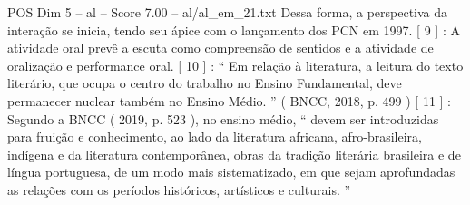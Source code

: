 \begin{textsample}{POS Dim 5 – al – Score 7.00 – al/al\_em\_21.txt}
Dessa forma, a perspectiva da interação se inicia, tendo seu ápice com o lançamento dos PCN em 1997. [ 9 ] : A atividade oral prevê a escuta como compreensão de sentidos e a atividade de oralização e performance oral. [ 10 ] : “ Em relação à literatura, a leitura do texto literário, que ocupa o centro do trabalho no Ensino Fundamental, deve permanecer nuclear também no Ensino Médio. ” ( BNCC, 2018, p. 499 ) [ 11 ] : Segundo a BNCC ( 2019, p. 523 ), no ensino médio, “ devem ser introduzidas para fruição e conhecimento, ao lado da literatura africana, afro-brasileira, indígena e da literatura contemporânea, obras da tradição literária brasileira e de língua portuguesa, de um modo mais sistematizado, em que sejam aprofundadas as relações com os períodos históricos, artísticos e culturais. ”

\end{textsample}
